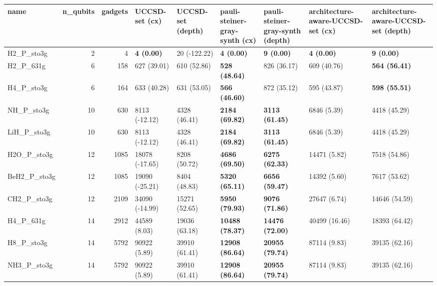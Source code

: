 \begin{tabular}{lrrllllll}
\toprule
name & n\_qubits & gadgets & UCCSD-set (cx) & UCCSD-set (depth) & pauli-steiner-gray-synth (cx) & pauli-steiner-gray-synth (depth) & architecture-aware-UCCSD-set (cx) & architecture-aware-UCCSD-set (depth) \\
\midrule
H2\_P\_sto3g & 2 & 4 & \textbf{4 (0.00)} & 20 (-122.22) & \textbf{4 (0.00)} & \textbf{9 (0.00)} & \textbf{4 (0.00)} & \textbf{9 (0.00)} \\
H2\_P\_631g & 6 & 158 & 627 (39.01) & 610 (52.86) & \textbf{528 (48.64)} & 826 (36.17) & 609 (40.76) & \textbf{564 (56.41)} \\
H4\_P\_sto3g & 6 & 164 & 633 (40.28) & 631 (53.05) & \textbf{566 (46.60)} & 872 (35.12) & 595 (43.87) & \textbf{598 (55.51)} \\
NH\_P\_sto3g & 10 & 630 & 8113 (-12.12) & 4328 (46.41) & \textbf{2184 (69.82)} & \textbf{3113 (61.45)} & 6846 (5.39) & 4418 (45.29) \\
LiH\_P\_sto3g & 10 & 630 & 8113 (-12.12) & 4328 (46.41) & \textbf{2184 (69.82)} & \textbf{3113 (61.45)} & 6846 (5.39) & 4418 (45.29) \\
H2O\_P\_sto3g & 12 & 1085 & 18078 (-17.65) & 8208 (50.72) & \textbf{4686 (69.50)} & \textbf{6275 (62.33)} & 14471 (5.82) & 7518 (54.86) \\
BeH2\_P\_sto3g & 12 & 1085 & 19090 (-25.21) & 8404 (48.83) & \textbf{5320 (65.11)} & \textbf{6656 (59.47)} & 14392 (5.60) & 7617 (53.62) \\
CH2\_P\_sto3g & 12 & 2109 & 34090 (-14.99) & 15271 (52.65) & \textbf{5950 (79.93)} & \textbf{9076 (71.86)} & 27647 (6.74) & 14646 (54.59) \\
H4\_P\_631g & 14 & 2912 & 44589 (8.03) & 19036 (63.18) & \textbf{10488 (78.37)} & \textbf{14476 (72.00)} & 40499 (16.46) & 18393 (64.42) \\
H8\_P\_sto3g & 14 & 5792 & 90922 (5.89) & 39910 (61.41) & \textbf{12908 (86.64)} & \textbf{20955 (79.74)} & 87114 (9.83) & 39135 (62.16) \\
NH3\_P\_sto3g & 14 & 5792 & 90922 (5.89) & 39910 (61.41) & \textbf{12908 (86.64)} & \textbf{20955 (79.74)} & 87114 (9.83) & 39135 (62.16) \\
\bottomrule
\end{tabular}
